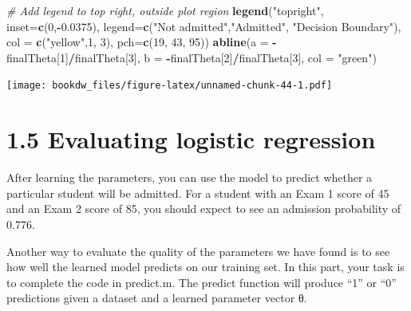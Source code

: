 \documentclass[
]{book}
\newenvironment{Shaded}{\begin{snugshade}}{\end{snugshade}}
\newcommand{\CommentTok}[1]{\textcolor[rgb]{0.56,0.35,0.01}{\textit{#1}}}
\newcommand{\DataTypeTok}[1]{\textcolor[rgb]{0.13,0.29,0.53}{#1}}
\newcommand{\DecValTok}[1]{\textcolor[rgb]{0.00,0.00,0.81}{#1}}
\newcommand{\FloatTok}[1]{\textcolor[rgb]{0.00,0.00,0.81}{#1}}
\newcommand{\KeywordTok}[1]{\textcolor[rgb]{0.13,0.29,0.53}{\textbf{#1}}}
\newcommand{\NormalTok}[1]{#1}
\newcommand{\OperatorTok}[1]{\textcolor[rgb]{0.81,0.36,0.00}{\textbf{#1}}}
\newcommand{\StringTok}[1]{\textcolor[rgb]{0.31,0.60,0.02}{#1}}
\begin{document}
\begin{Shaded}
\begin{Highlighting}[]
\CommentTok{# Add legend to top right, outside plot region}
\KeywordTok{legend}\NormalTok{(}\StringTok{"topright"}\NormalTok{, }\DataTypeTok{inset=}\KeywordTok{c}\NormalTok{(}\DecValTok{0}\NormalTok{,}\OperatorTok{-}\FloatTok{0.0375}\NormalTok{), }\DataTypeTok{legend=}\KeywordTok{c}\NormalTok{(}\StringTok{"Not admitted"}\NormalTok{,}\StringTok{"Admitted"}\NormalTok{, }\StringTok{"Decision Boundary"}\NormalTok{), }\DataTypeTok{col =} \KeywordTok{c}\NormalTok{(}\StringTok{"yellow"}\NormalTok{,}\DecValTok{1}\NormalTok{, }\DecValTok{3}\NormalTok{), }\DataTypeTok{pch=}\KeywordTok{c}\NormalTok{(}\DecValTok{19}\NormalTok{, }\DecValTok{43}\NormalTok{, }\DecValTok{95}\NormalTok{))}
\KeywordTok{abline}\NormalTok{(}\DataTypeTok{a =} \OperatorTok{-}\NormalTok{finalTheta[}\DecValTok{1}\NormalTok{]}\OperatorTok{/}\NormalTok{finalTheta[}\DecValTok{3}\NormalTok{], }\DataTypeTok{b =} \OperatorTok{-}\NormalTok{finalTheta[}\DecValTok{2}\NormalTok{]}\OperatorTok{/}\NormalTok{finalTheta[}\DecValTok{3}\NormalTok{], }\DataTypeTok{col =} \StringTok{"green"}\NormalTok{)}
\end{Highlighting}
\end{Shaded}

\texttt{[image: bookdw\_files/figure-latex/unnamed-chunk-44-1.pdf]}

\hypertarget{evaluating-logistic-regression}{%
\section{1.5 Evaluating logistic regression}\label{evaluating-logistic-regression}}

After learning the parameters, you can use the model to predict whether a particular student will be admitted. For a student with an Exam 1 score of 45 and an Exam 2 score of 85, you should expect to see an admission
probability of 0.776.

Another way to evaluate the quality of the parameters we have found is to see how well the learned model predicts on our training set. In this part, your task is to complete the code in predict.m. The predict function will produce ``1'' or ``0'' predictions given a dataset and a learned parameter vector θ.
\end{document}
